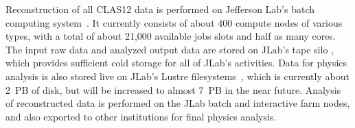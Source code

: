 Reconstruction of all CLAS12 data is performed on Jefferson Lab's batch computing system~\cite{jlab-batch-farm}.
It currently consists of about 400 compute nodes of various types, with a total of about 21,000 available jobs
slots and half as many cores.  The input raw data and analyzed output data are stored on JLab's tape silo
\cite{jlab-tape-silo}, which provides sufficient cold storage for all of JLab's activities.  Data for physics analysis is
also stored live on JLab's Lustre filesystems~\cite{jlab-lustre}, which is currently about 2~PB of disk, but will be
increased to almost 7~PB in the near future. Analysis of reconstructed data is performed on the JLab batch and
interactive farm nodes, and also exported to other institutions for final physics analysis.
